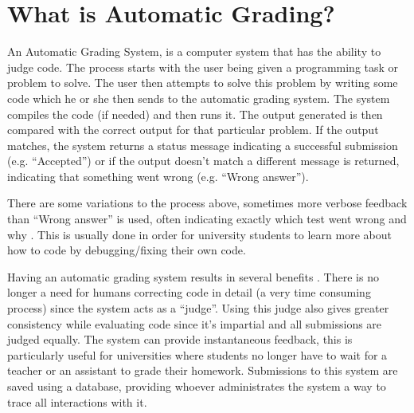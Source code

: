 \section{What is Automatic Grading?}
An Automatic Grading System, is a computer system that has the ability to judge code. The process starts with the user being given a programming task or problem to solve. The user then attempts to solve this problem by writing some code which he or she then sends to the automatic grading system. The system compiles the code (if needed) and then runs it. The output generated is then compared with the correct output for that particular problem. If the output matches, the system returns a status message indicating a successful submission (e.g. ``Accepted'') or if the output doesn't match a different message is returned, indicating that something went wrong (e.g. ``Wrong answer''). 

There are some variations to the process above, sometimes more verbose feedback than ``Wrong answer'' is used, often indicating exactly which test went wrong and why \cite{Gradebot}. This is usually done in order for university students to learn more about how to code by debugging/fixing their own code.

Having an automatic grading system results in several benefits \cite{Suleman}. There is no longer a need for humans correcting code in detail (a very time consuming process) since the system acts as a ``judge''. Using this judge also gives greater consistency while evaluating code since it's impartial and all submissions are judged equally. The system can provide instantaneous feedback, this is particularly useful for universities where students no longer have to wait for a teacher or an assistant to grade their homework. Submissions to this system are saved using a database, providing whoever administrates the system a way to trace all interactions with it.
